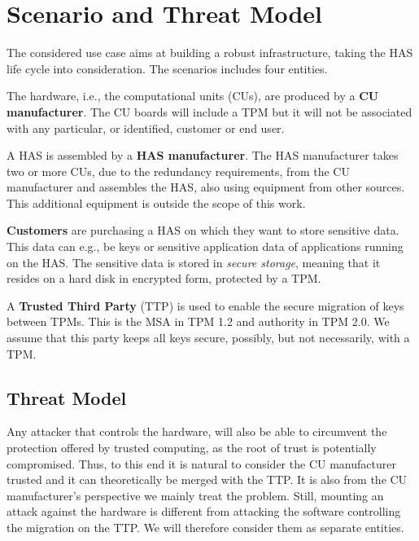 {\section{Scenario and Threat Model}
\label{sec:usecase}
The considered use case aims at building a robust infrastructure, taking the HAS life cycle into consideration. The scenarios includes four entities.

The hardware, i.e., the computational units (CUs), are produced by a \textbf{CU manufacturer}. The CU boards will include a TPM but it will not be associated with any particular, or identified, customer or end user.

A HAS is assembled by a \textbf{HAS manufacturer}. The HAS manufacturer takes two or more CUs, due to the redundancy requirements, from the CU manufacturer and assembles the HAS, also using equipment from other sources. This additional equipment is outside the scope of this work.

\textbf{Customers} are purchasing a HAS on which they want to store sensitive data. This data can e.g., be keys or sensitive application data of applications running on the HAS. The sensitive data is stored in \textit{secure storage}, meaning that it resides on a hard disk in encrypted form, protected by a TPM. 

A \textbf{Trusted Third Party} (TTP) is used to enable the secure migration of keys between TPMs. This is the MSA in TPM 1.2 and authority in TPM 2.0. We assume that this party keeps all keys secure, possibly, but not necessarily, with a TPM. %

\subsection{Threat Model}
Any attacker that controls the hardware, will also be able to circumvent the protection offered by trusted computing, as the root of trust is potentially compromised. Thus, to this end it is natural to consider the CU manufacturer trusted and it can theoretically be merged with the TTP. It is also from the CU manufacturer's perspective we mainly treat the problem. Still, mounting an attack against the hardware is different from attacking the software controlling the migration on the TTP. We will therefore consider them as separate entities. %

}
